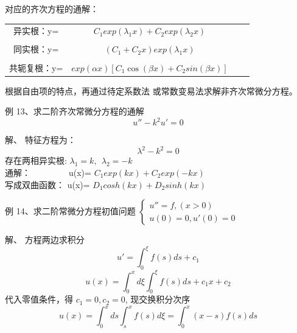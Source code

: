 \begin{frame}
	对应的齐次方程的通解：
	\begin{table} [H]
	\begin{tabular}{cccc}
		异实根：y=& $C_1 exp(\lambda_1 x)+ C_2 exp (\lambda_2 x) $  \\  
		\\
		同实根：y=&$(C_1+C_2x)  exp (\lambda_1 x) $   \\  
		\\
		共轭复根：y=& $ exp(\alpha x)  [C_1 \cos (\beta x)+ C_2 sin (\beta x)] $\\   
	\end{tabular}
	\end{table}
	根据自由项的特点，再通过待定系数法 或常数变易法求解非齐次常微分方程。
\end{frame}

\begin{frame}
\begin{exampleblock} {例 13、求二阶齐次常微分方程的通解}
	\begin{equation*}
		u''-k^2u'=0
	\end{equation*}
	\end{exampleblock}
	\alert{解、}  特征方程为：
	\begin{equation*}
		\lambda^2 -k^2=0
	\end{equation*}
	存在两相异实根: $\lambda_1=k, ~~ \lambda_2 =-k $ \\    	\vspace{0.3cm}
	通解：~~~~~~~~~u(x)= $C_1 exp(k x)+ C_2 exp (-k x) $  \\  	\vspace{0.3cm}
	写成双曲函数： u(x)= $D_1 cosh(k x)+ D_2 sinh (k x) $  \\
\end{frame}

\begin{frame}
\begin{exampleblock} {例 14、求二阶常微分方程初值问题}
	$\begin{cases}
		u'' =f, (x>0)\\
		u(0)=0, u'(0)=0
	\end{cases}$
	\end{exampleblock}
	\alert{解、} 方程两边求积分
	\begin{equation*}
		u'=\int_{0}^{\xi} f(s) ds +c_1
	\end{equation*}
	\begin{equation*}
		u(x)=\int_{0}^{x}   d\xi  \int_{0}^{\xi} f(s) ds +c_1x  +c_2
	\end{equation*}
	代入零值条件，得  $c_1=0, c_2=0$, 现交换积分次序\\
	\begin{equation*}
		u(x)=\int_{0}^{x}   ds  \int_{s}^{x} f(s) d\xi = \int_{0}^{x}  (x-s)f(s) ds 
	\end{equation*}      
\end{frame}

